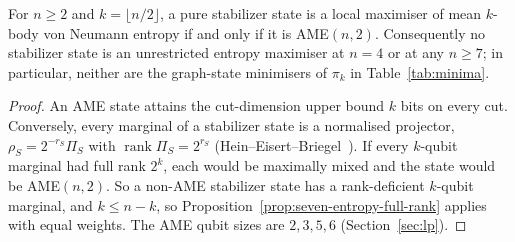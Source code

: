 \begin{corollary}
\label{cor:stabilizer-entropy-noname}
For $n\ge2$ and $k=\lfloor n/2\rfloor$, a pure stabilizer state is a local
maximiser of mean $k$-body von Neumann entropy if and only if it is
AME$(n,2)$. Consequently no stabilizer state is an unrestricted
entropy maximiser at $n=4$ or at any $n\ge7$; in particular, neither are the graph-state minimisers of $\pi_k$ in
Table~\ref{tab:minima}.
\end{corollary}
\begin{proof}
An AME state attains the cut-dimension upper bound $k$ bits on every cut.
Conversely, every marginal of a stabilizer state is a normalised projector, $\rho_S=2^{-r_S}\Pi_S$ with
$\operatorname{rank}\Pi_S=2^{r_S}$ (Hein--Eisert--Briegel~\cite{HEB}). If every $k$-qubit marginal had full rank $2^k$,
each would be maximally mixed and the state would be AME$(n,2)$. So a non-AME stabilizer state has a rank-deficient
$k$-qubit marginal, and $k\le n-k$, so Proposition~\ref{prop:seven-entropy-full-rank} applies with equal weights.
The AME qubit sizes are $2,3,5,6$ (Section~\ref{sec:lp}).
\end{proof}
